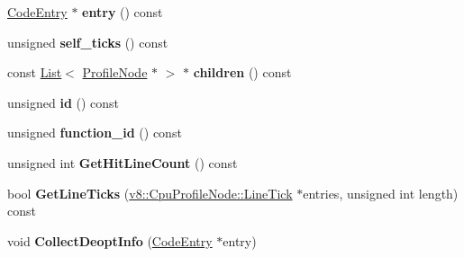 \begin{DoxyCompactItemize}
\item 
\hyperlink{classv8_1_1internal_1_1_code_entry}{Code\+Entry} $\ast$ {\bfseries entry} () const \hypertarget{classv8_1_1internal_1_1_profile_node_ad005fdfaa64e5363d646c80bc2d9b43f}{}\label{classv8_1_1internal_1_1_profile_node_ad005fdfaa64e5363d646c80bc2d9b43f}

\item 
unsigned {\bfseries self\+\_\+ticks} () const \hypertarget{classv8_1_1internal_1_1_profile_node_aaa113beacbfc9c2554aca110cac8ec46}{}\label{classv8_1_1internal_1_1_profile_node_aaa113beacbfc9c2554aca110cac8ec46}

\item 
const \hyperlink{classv8_1_1internal_1_1_list}{List}$<$ \hyperlink{classv8_1_1internal_1_1_profile_node}{Profile\+Node} $\ast$ $>$ $\ast$ {\bfseries children} () const \hypertarget{classv8_1_1internal_1_1_profile_node_a379d97d5038a260a945ab224571180fb}{}\label{classv8_1_1internal_1_1_profile_node_a379d97d5038a260a945ab224571180fb}

\item 
unsigned {\bfseries id} () const \hypertarget{classv8_1_1internal_1_1_profile_node_aa4b4f78b613dded4aea38443b4105c3a}{}\label{classv8_1_1internal_1_1_profile_node_aa4b4f78b613dded4aea38443b4105c3a}

\item 
unsigned {\bfseries function\+\_\+id} () const \hypertarget{classv8_1_1internal_1_1_profile_node_a81fa810cab9aaa81a96009dff469e1ff}{}\label{classv8_1_1internal_1_1_profile_node_a81fa810cab9aaa81a96009dff469e1ff}

\item 
unsigned int {\bfseries Get\+Hit\+Line\+Count} () const \hypertarget{classv8_1_1internal_1_1_profile_node_aef3c736723769968390b2c317fe2fdfb}{}\label{classv8_1_1internal_1_1_profile_node_aef3c736723769968390b2c317fe2fdfb}

\item 
bool {\bfseries Get\+Line\+Ticks} (\hyperlink{structv8_1_1_cpu_profile_node_1_1_line_tick}{v8\+::\+Cpu\+Profile\+Node\+::\+Line\+Tick} $\ast$entries, unsigned int length) const \hypertarget{classv8_1_1internal_1_1_profile_node_a0d806163118bd6666fdc0daccffc94e5}{}\label{classv8_1_1internal_1_1_profile_node_a0d806163118bd6666fdc0daccffc94e5}

\item 
void {\bfseries Collect\+Deopt\+Info} (\hyperlink{classv8_1_1internal_1_1_code_entry}{Code\+Entry} $\ast$entry)\hypertarget{classv8_1_1internal_1_1_profile_node_aef32ed3f614d3be0712f5386532bd62b}{}\label{classv8_1_1internal_1_1_profile_node_aef32ed3f614d3be0712f5386532bd62b}


\end{DoxyCompactItemize}
